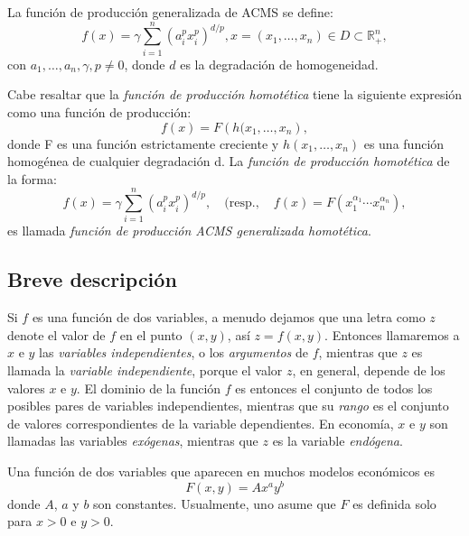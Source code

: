 La función de producción generalizada de ACMS se define:
\begin{equation}\label{eq:5}
f\left(x\right) = \gamma\sum_{i=1}^{n} ({{a}_{i}^{p}x_{i}^{p}})^{d/p},x=\left(x_{1},\ldots,x_{n}\right)\in D\subset\mathbb{R}_{+}^{n},
\end{equation}
con $a_{1},\ldots,a_{n},\gamma,p\neq0$, donde $d$ es la degradación de homogeneidad.

Cabe resaltar que la \emph{función de producción homotética} tiene la siguiente expresión como una función de producción:
\begin{equation}\label{eq:6}
f(x) = F\left(h(x_1,\ldots,x_n\right),
\end{equation}
donde F es una función estrictamente creciente y $h\left(x_1,\ldots,x_n\right)$ es una función homogénea de cualquier degradación d. La \emph{función de producción homotética} de la forma:
\begin{equation}\label{eq:7}
f\left(x\right) = \gamma\sum_{i=1}^{n} ({{a}_{i}^{p}x_{i}^{p}})^{d/p},\quad(\text{resp.},\quad f(x)=F(x_{1}^{\alpha_1}\cdots x_{n}^{\alpha_n}),
\end{equation}
es llamada \emph{función de producción ACMS generalizada homotética}.

\subsection{Breve descripción}

Si $f$ es una función de dos variables, a menudo dejamos que una letra como $z$ denote el valor de $f$ en el punto $\left(x,y\right)$, así $z=f\left(x,y\right)$. Entonces llamaremos a $x$ e $y$ las \emph{variables independientes}, o los \emph{argumentos} de $f$, mientras que $z$ es llamada la \emph{variable independiente}, porque el valor $z$, en general, depende de los valores $x$ e $y$. El dominio de la función $f$ es entonces el conjunto de todos los posibles pares de variables independientes, mientras que su \emph{rango} es el conjunto de valores correspondientes de la variable dependientes. En economía, $x$ e $y$ son llamadas las variables \emph{exógenas}, mientras que $z$ es la variable \emph{endógena}.

Una función de dos variables que aparecen en muchos modelos económicos es
\begin{equation}\label{eq:cobb-douglas}
F\left(x,y\right)=Ax^{a}y^{b}
\end{equation}
donde $A$, $a$ y $b$ son constantes. Usualmente, uno asume que $F$ es definida solo para $x>0$ e $y>0$.

